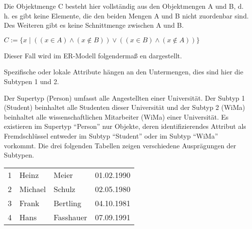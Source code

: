 \begin{center}
\end{center}
Die Objektmenge C besteht hier vollständig aus den Objektmengen A und
B, d. h. es gibt keine Elemente, die den beiden Mengen A und B nicht
zuordenbar sind. Des Weiteren gibt es keine Schnittmenge zwischen A und
B.

$C := \{x \mid ((x \in A) \wedge (x \notin B)) \vee ((x \in B) \wedge (x \notin A))\}$

Dieser Fall wird im ER-Modell folgendermaß en dargestellt.
\begin{center}
\end{center}
\begin{merke}
    Spezifische oder lokale Attribute hängen an den Untermengen, dies sind hier die Subtypen 1 und 2.
\end{merke}
Der Supertyp (Person) umfasst alle Angestellten einer Universität.
Der Subtyp 1 (Student) beinhaltet alle Studenten dieser Universität
und der Subtyp 2 (WiMa) beinhaltet alle wissenschaftlichen Mitarbeiter
(WiMa) einer Universität. Es existieren im Supertyp \enquote{Person}
nur Objekte, deren identifizierendes Attribut als Fremdschlüssel
entweder im Subtyp \enquote{Student} oder im Subtyp \enquote{WiMa}
vorkommt. Die drei folgenden Tabellen zeigen verschiedene
Ausprägungen der Subtypen.
\clearpage
{}
\begin{supertabular}[h]{llll}
    1 & Heinz & Meier & 01.02.1990 \\
    2 & Michael & Schulz & 02.05.1980 \\
    3 & Frank & Bertling & 04.10.1981 \\
    4 & Hans & Fasshauer & 07.09.1991 \\
\end{supertabular}

